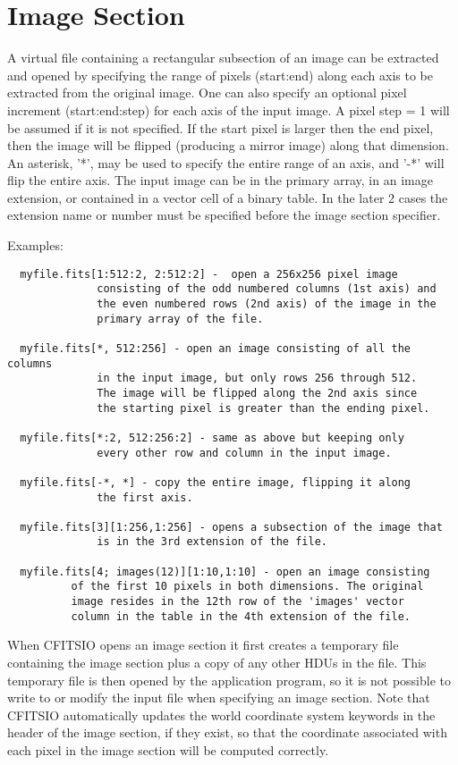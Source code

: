 \documentclass[11pt]{book}
\begin{document}
\section{Image Section}

A virtual file containing a rectangular subsection of an image can be
extracted and opened by specifying the range of pixels (start:end)
along each axis to be extracted from the original image.  One can also
specify an optional pixel increment (start:end:step) for each axis of
the input image.  A pixel step = 1 will be assumed if it is not
specified.  If the start pixel is larger then the end pixel, then the
image will be flipped (producing a mirror image) along that dimension.
An asterisk, '*', may be used to specify the entire range of an axis,
and '-*' will flip the entire axis. The input image can be in the
primary array, in an image extension, or contained in a vector cell of
a binary table. In the later 2 cases the extension name or number must
be specified before the image section specifier.

 Examples:

\begin{verbatim}
  myfile.fits[1:512:2, 2:512:2] -  open a 256x256 pixel image
              consisting of the odd numbered columns (1st axis) and
              the even numbered rows (2nd axis) of the image in the
              primary array of the file.

  myfile.fits[*, 512:256] - open an image consisting of all the columns
              in the input image, but only rows 256 through 512.
              The image will be flipped along the 2nd axis since
              the starting pixel is greater than the ending pixel.

  myfile.fits[*:2, 512:256:2] - same as above but keeping only
              every other row and column in the input image.

  myfile.fits[-*, *] - copy the entire image, flipping it along
              the first axis.

  myfile.fits[3][1:256,1:256] - opens a subsection of the image that
              is in the 3rd extension of the file.

  myfile.fits[4; images(12)][1:10,1:10] - open an image consisting
	      of the first 10 pixels in both dimensions. The original
	      image resides in the 12th row of the 'images' vector
	      column in the table in the 4th extension of the file.
\end{verbatim}

When CFITSIO opens an image section it first creates a temporary file
containing the image section plus a copy of any other HDUs in the
file.  This temporary file is then opened by the application program,
so it is not possible to write to or modify the input file when
specifying an image section.  Note that CFITSIO automatically updates
the world coordinate system keywords in the header of the image
section, if they exist, so that the coordinate associated with each
pixel in the image section will be computed correctly.
\end{document}
